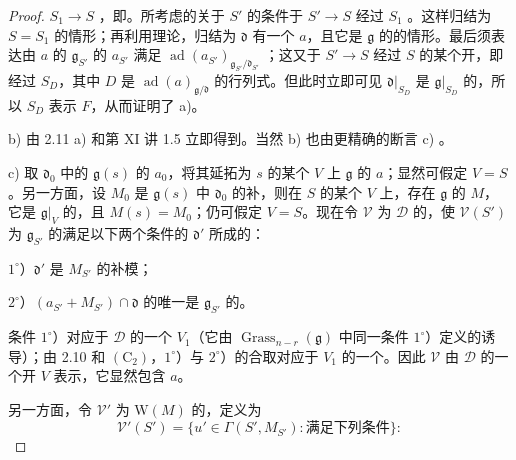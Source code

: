 \begin{proof}
$S_1\to S$ ，即。所考虑的关于 $S'$ 的条件于 $S'\to S$ 经过 $S_1$ 。这样归结为 $S=S_1$ 的情形；再利用理论，归结为 $\mathfrak d$ 有一个 $a$，且它是 $\mathfrak g$ 的的情形。最后须表达由 $a$ 的 $\mathfrak g_{S'}$ 的 $a_{S'}$ 满足 $\operatorname{ad}(a_{S'})_{\mathfrak g_{S'}/\mathfrak d_{S'}}$ ；这又于 $S'\to S$ 经过 $S$ 的某个开，即经过 $S_D$，其中 $D$ 是 $\operatorname{ad}(a)_{\mathfrak g/\mathfrak d}$ 的行列式。但此时立即可见 $\mathfrak d|_{S_D}$ 是 $\mathfrak g|_{S_D}$ 的，所以 $S_D$ 表示 $F$，从而证明了 a)。

b) 由 2.11 a) 和第 XI 讲 1.5 立即得到。当然 b) 也由更精确的断言 c) 。

c) 取 $\mathfrak d_0$ 中的 $\mathfrak g(s)$ 的 $a_0$，将其延拓为 $s$ 的某个 $V$ 上 $\mathfrak g$ 的 $a$；显然可假定 $V=S$。另一方面，设 $M_0$ 是 $\mathfrak g(s)$ 中 $\mathfrak d_0$ 的补，则在 $S$ 的某个 $V$ 上，存在 $\mathfrak g$ 的 $M$，它是 $\mathfrak g|_V$ 的，且 $M(s)=M_0$；仍可假定 $V=S$。现在令 $\mathcal V$ 为 $\mathcal D$ 的，使 $\mathcal V(S')$ 为 $\mathfrak g_{S'}$ 的满足以下两个条件的 $\mathfrak d'$ 所成的：

$1^\circ$）$\mathfrak d'$ 是 $M_{S'}$ 的补模；

$2^\circ$）$(a_{S'}+M_{S'})\cap\mathfrak d$ 的唯一是 $\mathfrak g_{S'}$ 的。

条件 $1^\circ$）对应于 $\mathcal D$ 的一个 $V_1$（它由 $\operatorname{Grass}_{n-r}(\mathfrak g)$ 中同一条件 $1^\circ$）定义的诱导）；由 2.10 和 $(\mathrm C_2)$，$1^\circ$）与 $2^\circ$）的合取对应于 $V_1$ 的一个。因此 $\mathcal V$ 由 $\mathcal D$ 的一个开 $V$ 表示，它显然包含 $a$。

另一方面，令 $\mathcal V'$ 为 $\mathrm W(M)$ 的，定义为
\[\mathcal V'(S')=\{u'\in\Gamma(S',M_{S'}):\text{满足下列条件}\}:\]


\end{proof}
